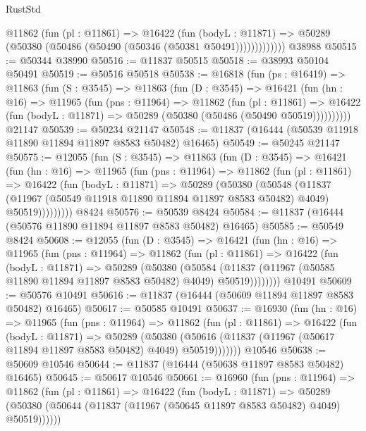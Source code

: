 \begin{lexlean}{RustStd}
\begin{coremodule}
              @11862
                (fun (pl : @11861) =>
                @16422
                  (fun (bodyL : @11871) =>
                  @50289 (@50380 (@50486 (@50490 (@50346 (@50381 @50491)))))))))))))
    @38988
@50515 := @50344 @38990
@50516 := @11837 @50515
@50518 := @38993 @50104 @50491
@50519 := @50516 @50518
@50538 := @16818
    (fun (ps : @16419) =>
    @11863
      (fun (S : @3545) =>
      @11863
        (fun (D : @3545) =>
        @16421
          (fun (hn : @16) =>
          @11965
            (fun (pns : @11964) =>
            @11862
              (fun (pl : @11861) =>
              @16422 (fun (bodyL : @11871) => @50289 (@50380 (@50486 (@50490 @50519))))))))))
    @21147
@50539 := @50234 @21147
@50548 := @11837 (@16444 (@50539 @11918 @11890 @11894 @11897 @8583 @50482) @16465)
@50549 := @50245 @21147
@50575 := @12055
    (fun (S : @3545) =>
    @11863
      (fun (D : @3545) =>
      @16421
        (fun (hn : @16) =>
        @11965
          (fun (pns : @11964) =>
          @11862
            (fun (pl : @11861) =>
            @16422
              (fun (bodyL : @11871) =>
              @50289
                (@50380
                  (@50548
                    (@11837
                      (@11967 (@50549 @11918 @11890 @11894 @11897 @8583 @50482) @4049)
                      @50519)))))))))
    @8424
@50576 := @50539 @8424
@50584 := @11837 (@16444 (@50576 @11890 @11894 @11897 @8583 @50482) @16465)
@50585 := @50549 @8424
@50608 := @12055
    (fun (D : @3545) =>
    @16421
      (fun (hn : @16) =>
      @11965
        (fun (pns : @11964) =>
        @11862
          (fun (pl : @11861) =>
          @16422
            (fun (bodyL : @11871) =>
            @50289
              (@50380
                (@50584
                  (@11837 (@11967 (@50585 @11890 @11894 @11897 @8583 @50482) @4049) @50519))))))))
    @10491
@50609 := @50576 @10491
@50616 := @11837 (@16444 (@50609 @11894 @11897 @8583 @50482) @16465)
@50617 := @50585 @10491
@50637 := @16930
    (fun (hn : @16) =>
    @11965
      (fun (pns : @11964) =>
      @11862
        (fun (pl : @11861) =>
        @16422
          (fun (bodyL : @11871) =>
          @50289
            (@50380 (@50616 (@11837 (@11967 (@50617 @11894 @11897 @8583 @50482) @4049) @50519)))))))
    @10546
@50638 := @50609 @10546
@50644 := @11837 (@16444 (@50638 @11897 @8583 @50482) @16465)
@50645 := @50617 @10546
@50661 := @16960
    (fun (pns : @11964) =>
    @11862
      (fun (pl : @11861) =>
      @16422
        (fun (bodyL : @11871) =>
        @50289 (@50380 (@50644 (@11837 (@11967 (@50645 @11897 @8583 @50482) @4049) @50519))))))

\end{coremodule}
\end{lexlean}
